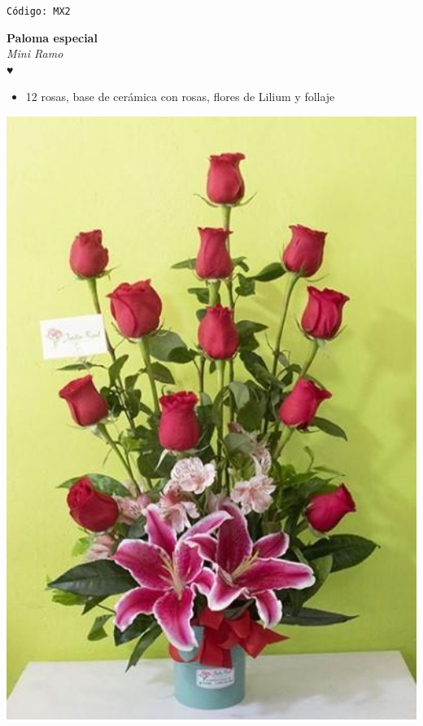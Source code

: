 \documentclass[12pt]{article}
\begin{document}
\begin{center}
    \textcolor[HTML]{191970}{\texttt{Código: MX2}}
\end{center}
\vspace{1cm}
\noindent
\begin{minipage}{0.6\textwidth}
    \textcolor[HTML]{FF8C00}{\textbf{\huge Paloma especial }}\\
    {\textit{Mini Ramo}} \\
    \textcolor[HTML]{FF8C00}{\Huge ♥} \\
    \vspace{0.5cm}
    \begin{itemize}
        \item 12 rosas, base de cerámica con rosas, flores de Lilium y follaje
    \end{itemize}
\end{minipage}
\hspace{1cm}
\begin{minipage}{0.35\textwidth}
    \includegraphics[width=1.0\textwidth]{imagenes_extraidas/image_9_2}
\end{minipage}
\end{document}
